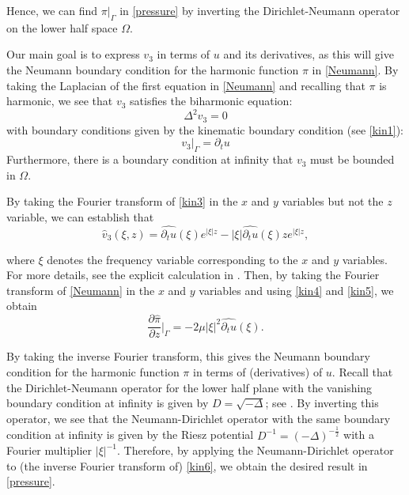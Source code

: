 \documentclass[letterpaper, 11pt,  reqno]{amsart}
\newcommand{\1}{\hspace{0.5mm}\text{I}\hspace{0.2mm}}
\newcommand{\noi}{\noindent}
\newcommand{\Dl}{\Delta}
\newcommand{\ft}{\widehat}
\newcommand{\dt}{\partial_t}
\renewcommand{\O}{\Omega}
\numberwithin{equation}{section}
\numberwithin{theorem}{section}
\begin{document}
\noi
Hence, 
 we can find $\pi|_{\Gamma}$ in \eqref{pressure} by inverting the Dirichlet-Neumann operator on the 
 lower half space $\Omega$. 
 
 Our main goal is to express
  $v_{3}$ in terms of $u$ and its derivatives, as this will give the Neumann boundary condition for the harmonic function $\pi$ in \eqref{Neumann}. 
  By taking the Laplacian of the first equation in \eqref{Neumann} and recalling that $\pi$ is harmonic, 
  we see that $v_3$ satisfies the biharmonic equation:
\begin{equation}
\Delta^{2} v_{3} = 0
\label{kin3}
\end{equation}
with boundary conditions given by the kinematic boundary condition (see \eqref{kin1}):
\begin{equation}
v_{3}|_{\Gamma} =\dt  u
\label{kin4}
\end{equation}
 Furthermore, there is a boundary condition at infinity that $v_{3}$ must be bounded in 
 $\O$. 
 
 
By taking the Fourier transform of \eqref{kin3} in the $x$ and $y$ variables 
but not the $z$ variable, we can establish that 
\begin{equation}
\ft v_3 (\xi, z) = \ft {\dt u}(\xi )e^{|\xi|z} - |\xi|\ft{\dt u}(\xi)ze^{|\xi| z}, 
\label{kin5}
\end{equation}


\noi
where $\xi$ denotes the frequency variable corresponding to the $x$ and $y$ variables.
For more details, see the explicit calculation in \cite{KC}. 
Then, by taking the Fourier transform of \eqref{Neumann} in the $x$ and $y$ variables 
and using \eqref{kin4} and \eqref{kin5}, we obtain
\begin{equation}
\frac{\partial \widehat{\pi}}{\partial z}\Big\vert_{\Gamma} = -2\mu|\xi|^{2} \ft {\dt u }(\xi).
\label{kin6}
\end{equation}



\noi
By taking the inverse Fourier transform, this gives 
 the Neumann boundary condition for the harmonic function $\pi$
 in terms of (derivatives) of $u$.
Recall that 
the Dirichlet-Neumann operator for the lower half plane with the vanishing  boundary condition at  infinity is given by $D = \sqrt{-\Delta}$; see \cite{CS}.
By inverting this operator, 
we see that  the Neumann-Dirichlet operator with the same boundary condition at infinity is 
given by the Riesz potential $D^{-1} = (-\Dl)^{-\frac 12}$
with a Fourier multiplier  $|\xi|^{-1}$.
Therefore, by applying the 
 Neumann-Dirichlet operator to (the inverse Fourier transform of) \eqref{kin6}, 
 we obtain the desired result in \eqref{pressure}. 
\end{document}

